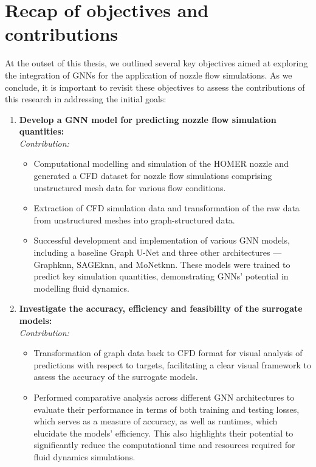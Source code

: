 \section{Recap of objectives and contributions}
At the outset of this thesis, we outlined several key objectives aimed at exploring the integration of GNNs for the application of nozzle flow simulations. As we conclude, it is important to revisit these objectives to assess the contributions of this research in addressing the initial goals:
\begin{enumerate}
    \item \textbf{Develop a GNN model for predicting nozzle flow simulation quantities:} \\
    \textit{Contribution:}
    \begin{itemize}
        \item Computational modelling and simulation of the HOMER nozzle and generated a CFD dataset for nozzle flow simulations comprising unstructured mesh data for various flow conditions. 
        \item Extraction of CFD simulation data and transformation of the raw data from unstructured meshes into graph-structured data.
        \item Successful development and implementation of various GNN models, including a baseline Graph U-Net and three other architectures — Graphknn, SAGEknn, and MoNetknn. These models were trained to predict key simulation quantities, demonstrating GNNs' potential in modelling fluid dynamics.
    \end{itemize}   
    \item \textbf{Investigate the accuracy, efficiency and feasibility of the surrogate models:} \\
    \textit{Contribution:}
    \begin{itemize}
        \item Transformation of graph data back to CFD format for visual analysis of predictions with respect to targets, facilitating a clear visual framework to assess the accuracy of the surrogate models.
        \item Performed comparative analysis across different GNN architectures to evaluate their performance in terms of both training and testing losses, which serves as a measure of accuracy, as well as runtimes, which elucidate the models' efficiency. This also highlights their potential to significantly reduce the computational time and resources required for fluid dynamics simulations. 
    \end{itemize}

\end{enumerate}
